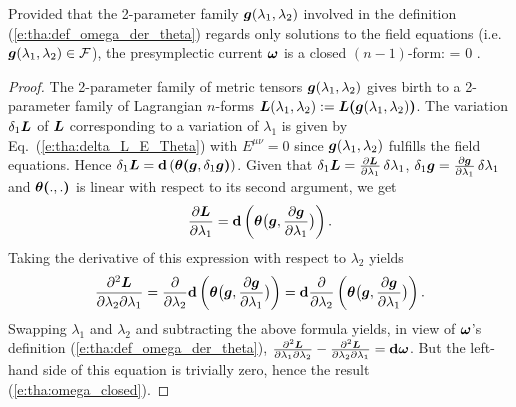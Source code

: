 \begin{prop}
\label{p:tha:omega_closed}
Provided that the 2-parameter family $\bm{g}(\lambda_1,\lambda_2)$
involved in the definition (\ref{e:tha:def_omega_der_theta}) regards
only solutions to the field equations (i.e. $\bm{g}(\lambda_1,\lambda_2) \in \mathcal{F}$),
the presymplectic current $\bm{\omega}$ is a closed $(n-1)$-form:
\be \label{e:tha:omega_closed}
    \dd \w{\omega} = 0 .
\ee
\end{prop}
\begin{proof}
The 2-parameter family of metric tensors $\bm{g}(\lambda_1,\lambda_2)$ gives birth
to a 2-parameter family of Lagrangian $n$-forms
$\bm{L}(\lambda_1,\lambda_2) := \bm{L}\textbf{(}\bm{g}(\lambda_1,\lambda_2)\textbf{)}$.
The variation $\delta_1\bm{L}$ of $\bm{L}$ corresponding to a variation of $\lambda_1$ is
given by Eq.~(\ref{e:tha:delta_L_E_Theta}) with $E^{\mu\nu} = 0$ since
$\bm{g}(\lambda_1,\lambda_2)$ fulfills the field equations. Hence
$\delta_1 \bm{L} = \mathbf{d} \left( \bm{\theta}\textbf{(}\bm{g}, \delta_1 \bm{g}\textbf{)} \right)$.
Given that $\delta_1 \bm{L} = \frac{\partial \bm{L}}{\partial \lambda_1}  \, \delta \lambda_1$,
$\delta_1 \bm{g} = \frac{\partial \bm{g}}{\partial \lambda_1} \, \delta \lambda_1$
and $\bm{\theta}\textbf{(} .,.\textbf{)}$ is linear with respect to its second argument, we get
\[
    \frac{\partial \bm{L}}{\partial \lambda_1} = \mathbf{d} \left( \bm{\theta} \bm{\big(}\bm{g},  \frac{\partial \bm{g}}{\partial \lambda_1} \bm{\big)} \right) .
\]
Taking the derivative of this expression with respect to $\lambda_2$ yields
\[
    \frac{\partial^2\bm{L}}{\partial\lambda_2\partial\lambda_1} = \frac{\partial }{\partial \lambda_2}
        \mathbf{d} \left( \bm{\theta} \bm{\big(}\bm{g},  \frac{\partial \bm{g}}{\partial \lambda_1} \bm{\big)} \right)
        = \mathbf{d}  \frac{\partial }{\partial \lambda_2} \left( \bm{\theta} \bm{\big(}\bm{g},  \frac{\partial \bm{g}}{\partial \lambda_1} \bm{\big)} \right) .
\]
Swapping $\lambda_1$ and $\lambda_2$ and subtracting the above formula
yields, in view of $\bm{\omega}$'s definition (\ref{e:tha:def_omega_der_theta}),
$\frac{\partial^2\bm{L}}{\partial\lambda_1\partial\lambda_2} - \frac{\partial^2\bm{L}}{\partial\lambda_2\partial\lambda_1} = \mathbf{d}\bm{\omega}$. But the left-hand side of this equation
is trivially zero, hence the result (\ref{e:tha:omega_closed}).
\end{proof}

